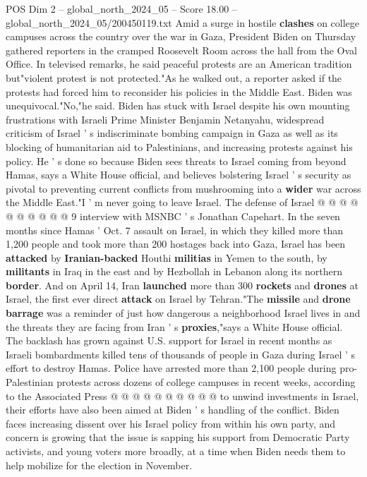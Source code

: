 \begin{textsample}{POS Dim 2 – global\_north\_2024\_05 – Score 18.00 – global\_north\_2024\_05/200450119.txt}  \label{ex:f2_pos_384}
Amid a surge in hostile \textbf{clashes} on college campuses across the country over the war in Gaza, President Biden on Thursday gathered reporters in the cramped Roosevelt Room across the hall from the Oval Office.
In televised remarks, he said peaceful protests are an American tradition but"violent protest is not protected."As he walked out, a reporter asked if the protests had forced him to reconsider his policies in the Middle East.
Biden was unequivocal."No,"he said.
Biden has stuck with Israel despite his own mounting frustrations with Israeli Prime Minister Benjamin Netanyahu, widespread criticism of Israel ' s indiscriminate bombing campaign in Gaza as well as its blocking of humanitarian aid to Palestinians, and increasing protests against his policy.
He ' s done so because Biden sees threats to Israel coming from beyond Hamas, says a White House official, and believes bolstering Israel ' s security as pivotal to preventing current conflicts from mushrooming into a \textbf{wider} war across the Middle East."I ' m never going to leave Israel.
The defense of Israel @ @ @ @ @ @ @ @ @ @ 9 interview with MSNBC ' s Jonathan Capehart.
In the seven months since Hamas ' Oct. 7 assault on Israel, in which they killed more than 1,200 people and took more than 200 hostages back into Gaza, Israel has been \textbf{attacked} by \textbf{Iranian-backed} Houthi \textbf{militias} in Yemen to the south, by \textbf{militants} in Iraq in the east and by Hezbollah in Lebanon along its northern \textbf{border}.
And on April 14, Iran \textbf{launched} more than 300 \textbf{rockets} and \textbf{drones} at Israel, the first ever direct \textbf{attack} on Israel by Tehran."The \textbf{missile} and \textbf{drone} \textbf{barrage} was a reminder of just how dangerous a neighborhood Israel lives in and the threats they are facing from Iran ' s \textbf{proxies},"says a White House official.
The backlash has grown against U.S. support for Israel in recent months as Israeli bombardments killed tens of thousands of people in Gaza during Israel ' s effort to destroy Hamas.
Police have arrested more than 2,100 people during pro-Palestinian protests across dozens of college campuses in recent weeks, according to the Associated Press @ @ @ @ @ @ @ @ @ @ to unwind investments in Israel, their efforts have also been aimed at Biden ' s handling of the conflict.
Biden faces increasing dissent over his Israel policy from within his own party, and concern is growing that the issue is sapping his support from Democratic Party activists, and young voters more broadly, at a time when Biden needs them to help mobilize for the election in November.

\end{textsample}
